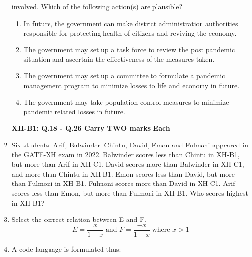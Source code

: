 \documentclass[12pt]{article}
\theoremstyle{remark}
\begin{document}
\begin{enumerate}
involved. 
Which of the following action(s) are plausible? 
\begin{enumerate}
\item In future, the government can make district administration authorities responsible
for protecting health of citizens and reviving the economy. 
\item The government may set up a task force to review the post pandemic situation and
ascertain the effectiveness of the measures taken. 
\item The government may set up a committee to formulate a pandemic management
program to minimize losses to life and economy in future. 
\item The government may take population control measures to minimize pandemic
related losses in future. 
\end{enumerate}
\hfill{}
\newpage
\textbf{XH-B1: Q.18 - Q.26 Carry TWO marks Each} 
\item Six students, Arif, Balwinder, Chintu, David, Emon and Fulmoni appeared in the
GATE-XH exam in 2022. Balwinder scores less than Chintu in XH-B1, but more
than Arif in XH-C1. David scores more than Balwinder in XH-C1, and more than
Chintu in XH-B1. Emon scores less than David, but more than Fulmoni in XH-B1.
Fulmoni scores more than David in XH-C1. Arif scores less than Emon, but more
than Fulmoni in XH-B1. Who scores highest in XH-B1? 
\begin{enumerate}  \end{enumerate}
\hfill{}
\item Select the correct relation between E and F. 
$$ E=\frac{x}{1+x} \text{ and } F=\frac{-x}{1-x} \text{ where } x>1 $$ 
\begin{enumerate}  \end{enumerate}
\hfill{}
\item A code language is formulated thus:

\end{enumerate}
\end{document}
